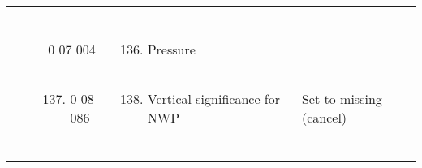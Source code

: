 \begin{longtable}[]{@{}llll@{}}
\begin{minipage}[t]{0.22\columnwidth}
\begin{enumerate}
\end{enumerate}\strut
\end{minipage} & \begin{minipage}[t]{0.22\columnwidth}\raggedright
\strut
\end{minipage}\tabularnewline
\begin{minipage}[t]{0.22\columnwidth}\raggedright
\strut
\end{minipage} & \begin{minipage}[t]{0.22\columnwidth}\raggedright
0 07 004\strut
\end{minipage} & \begin{minipage}[t]{0.22\columnwidth}\raggedright
\begin{enumerate}
\setcounter{enumi}{135}
\item
  Pressure
\end{enumerate}\strut
\end{minipage} & \begin{minipage}[t]{0.22\columnwidth}\raggedright
\strut
\end{minipage}\tabularnewline
\begin{minipage}[t]{0.22\columnwidth}\raggedright
\strut
\end{minipage} & \begin{minipage}[t]{0.22\columnwidth}\raggedright
\begin{enumerate}
\setcounter{enumi}{136}
\item
  0 08 086
\end{enumerate}\strut
\end{minipage} & \begin{minipage}[t]{0.22\columnwidth}\raggedright
\begin{enumerate}
\setcounter{enumi}{137}
\item
  Vertical significance for NWP
\end{enumerate}\strut
\end{minipage} & \begin{minipage}[t]{0.22\columnwidth}\raggedright
Set to missing (cancel)\strut
\end{minipage}\tabularnewline
\begin{minipage}[t]{0.22\columnwidth}\raggedright
\strut
\end{minipage} & \begin{minipage}[t]{0.22\columnwidth}\raggedright
\strut
\end{minipage} & \begin{minipage}[t]{0.22\columnwidth}\raggedright
\begin{enumerate}

\end{enumerate}
\end{minipage}
\end{longtable}
